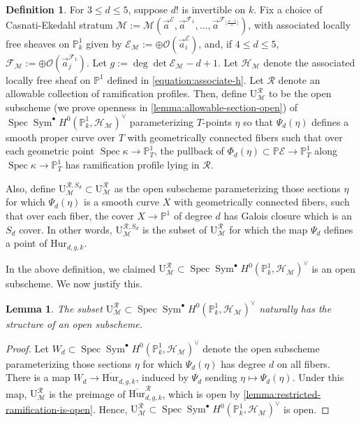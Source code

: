 \documentclass[12 pt]{amsart}
\newcommand{\rboxed}[1]{#1}
\theoremstyle{plain}
\newtheorem{lemma}[theorem]{Lemma}
\theoremstyle{definition}
\newtheorem{definition}[theorem]{Definition}
\theoremstyle{remark}
\numberwithin{equation}{section}
\newcommand\bp{\mathbb P}
\newcommand\sce{\mathscr E}
\newcommand\scf{\mathscr F}
\newcommand\sch{\mathscr H}
\newcommand\sco{\mathscr O}
\newcommand \ra{\rightarrow}
\DeclareMathOperator\spec{\operatorname{Spec}}
\newcommand\bighurg[3]{\overline{\mathrm{Hur}}_{#1,#2, #3}} %
\newcommand\bigrhur[4]{\overline{\mathrm{Hur}}_{#1,#2, #3}^{#4}} %
\newcommand\hur[3]{\mathrm{Hur}_{#1,#2,#3}} %
\newcommand\ce{\mathscr M} %
\newcommand\ramlocus[2]{\mathrm{U}_{#1}^{#2}} %
\DeclareMathOperator\sym{Sym}
\begin{document}
\begin{definition} \label{definition:smooth-locus} For $3 \leq d \leq 5$, 
	suppose $d!$ is invertible on $k$.
	Fix a choice of Casnati-Ekedahl stratum $\rboxed{\ce} :=
	\ce(\vec a^\sce, \vec a^{\scf_1} , \ldots, \vec a^{\scf_{\lfloor \frac{d-2}{2} \rfloor}})$, with
	associated locally free sheaves on $\bp^1_k$ given by $\rboxed{\sce_\ce}
	:= \oplus \sco(\vec a^\sce_i)$, and, if $4 \leq d \leq 5$,
	$\rboxed{\scf_\ce} := \oplus \sco(\vec a^{\scf_1}_j)$. 
	Let $g := \deg
	\det \sce_\ce - d + 1$.  Let $\rboxed{\sch_\ce}$ denote the
	associated locally free sheaf on $\bp^1$ defined in
	\eqref{equation:associate-h}.  Let $\rboxed{\mathcal R}$ denote an
	allowable collection of ramification profiles.  
	Then, define $\ramlocus \ce {\mathcal R}$ to be the open subscheme (we
		prove openness in
	\autoref{lemma:allowable-section-open}) of $\spec
	\sym^\bullet H^0(\bp^1_k, \sch_\ce)^\vee$ parameterizing $T$-points $\eta$ so that 
	$\Psi_d(\eta)$
	defines a smooth proper curve
	over $T$ with geometrically
	connected fibers such that over each geometric point $\spec \kappa \to
	\bp^1_T$,
	the pullback of $\Phi_d(\eta) \subset \bp \sce \ra
	\bp^1_T$ along $\spec \kappa \ra \bp^1_T$ has ramification profile lying in
	$\mathcal R$. 

	Also, define $\ramlocus {\ce}{\mathcal R, S_d} \subset \ramlocus
	{\ce}{\mathcal R}$ as the open subscheme parameterizing those sections
	$\eta$ for which $\Psi_d(\eta)$
	is a smooth curve $X$ with geometrically connected fibers, such that
	over each fiber, the cover $X \to \bp^1$ of degree $d$
	has Galois closure which is an $S_d$ cover.
	In other words, $\ramlocus {\ce}{\mathcal R, S_d}$ is the subset of
	$\ramlocus
	{\ce}{\mathcal R}$
	for which the map $\Psi_d$
	defines a point of $\hur d g k$.
	\end{definition} 

In the above definition, we claimed $\ramlocus \ce {\mathcal R} \subset \spec
\sym^\bullet H^0(\bp^1_k, \sch_\ce)^\vee$ is an open subscheme. We now justify
this.

\begin{lemma}
	\label{lemma:allowable-section-open}
	The subset 
$\ramlocus \ce {\mathcal R} \subset \spec \sym^\bullet H^0(\bp^1_k, \sch_\ce)^\vee$
naturally has the
structure of an open subscheme.
\end{lemma}
\begin{proof}
	Let $W_d \subset \spec \sym^\bullet H^0(\bp^1_k, \sch_\ce)^\vee$ denote
	the open subscheme parameterizing those
	sections $\eta$ for which $\Psi_d(\eta)$ has degree $d$ on all fibers.
	There is a map $W_d \to \bighurg d g k$,
	induced by $\Psi_d$ sending $\eta \mapsto \Psi_d(\eta)$.
	Under this map, $\ramlocus\ce {\mathcal R}$ is the preimage of
	$\bigrhur d g k {\mathcal R}$, which is open by
	\autoref{lemma:restricted-ramification-is-open}.
	Hence, $\ramlocus \ce {\mathcal R} \subset \spec \sym^\bullet H^0(\bp^1_k, \sch_\ce)^\vee$
	is open.
\end{proof}
\end{document}
